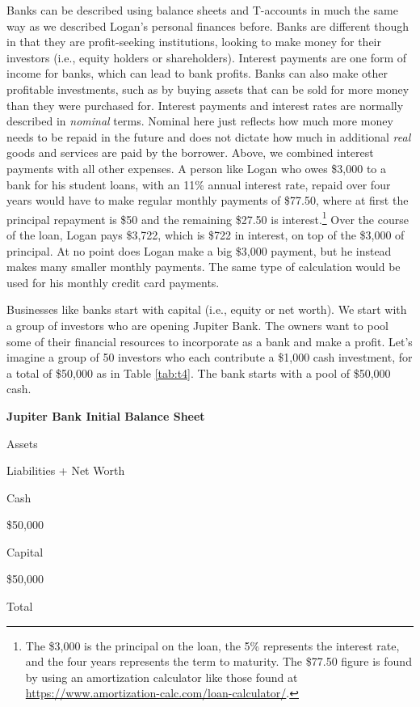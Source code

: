 \documentclass[
]{book}
\begin{document}
Banks can be described using balance sheets and T-accounts in much the same way as we described Logan's personal finances before. Banks are different though in that they are profit-seeking institutions, looking to make money for their investors (i.e., equity holders or shareholders). Interest payments are one form of income for banks, which can lead to bank profits. Banks can also make other profitable investments, such as by buying assets that can be sold for more money than they were purchased for. Interest payments and interest rates are normally described in \emph{nominal} terms. Nominal here just reflects how much more money needs to be repaid in the future and does not dictate how much in additional \emph{real} goods and services are paid by the borrower. Above, we combined interest payments with all other expenses. A person like Logan who owes \$3,000 to a bank for his student loans, with an 11\% annual interest rate, repaid over four years would have to make regular monthly payments of \$77.50, where at first the principal repayment is \$50 and the remaining \$27.50 is interest.\footnote{The \$3,000 is the principal on the loan, the 5\% represents the interest rate, and the four years represents the term to maturity. The \$77.50 figure is found by using an amortization calculator like those found at \url{https://www.amortization-calc.com/loan-calculator/}.} Over the course of the loan, Logan pays \$3,722, which is \$722 in interest, on top of the \$3,000 of principal. At no point does Logan make a big \$3,000 payment, but he instead makes many smaller monthly payments. The same type of calculation would be used for his monthly credit card payments.

Businesses like banks start with capital (i.e., equity or net worth). We start with a group of investors who are opening Jupiter Bank. The owners want to pool some of their financial resources to incorporate as a bank and make a profit. Let's imagine a group of 50 investors who each contribute a \$1,000 cash investment, for a total of \$50,000 as in Table \ref{tab:t4}. The bank starts with a pool of \$50,000 cash.

\label{tab:t4}\textbf{Jupiter Bank Initial Balance Sheet}

Assets

Liabilities + Net Worth

Cash

\$50,000

Capital

\$50,000

Total
\end{document}
